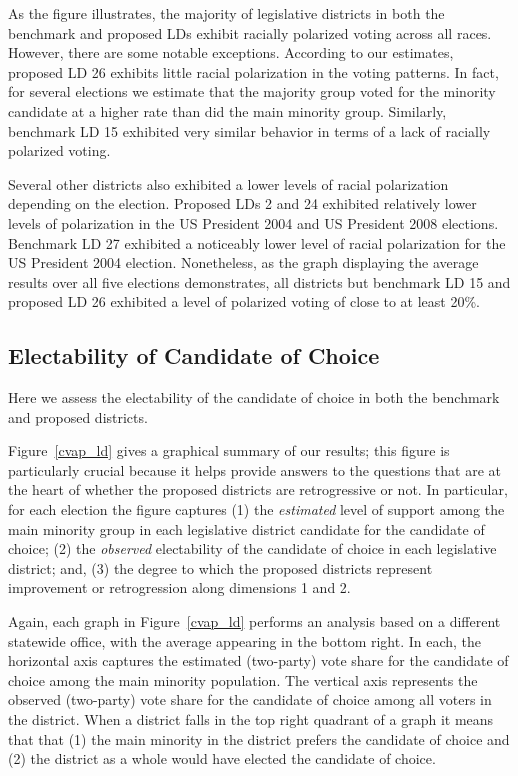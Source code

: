 \documentclass[12pt]{article}
\begin{document}
As the figure illustrates, the majority of legislative districts in both the benchmark and proposed LDs exhibit racially polarized voting across all races. However, there are some notable exceptions. According to our estimates, proposed LD 26 exhibits little racial polarization in the voting patterns. In fact, for several elections we estimate that the majority group voted for the minority candidate at a higher rate than did the main minority group. Similarly, benchmark LD 15 exhibited very similar behavior in terms of a lack of racially polarized voting.

Several other districts also exhibited a lower levels of racial polarization depending on the election. Proposed LDs 2 and 24 exhibited relatively lower levels of polarization in the US President 2004 and US President 2008 elections. Benchmark LD 27 exhibited a noticeably lower level of racial polarization for the US President 2004 election. Nonetheless, as the graph displaying the average results over all five elections demonstrates, all districts but benchmark LD 15 and proposed LD 26 exhibited a level of polarized voting of close to at least 20\%.

\subsection{Electability of Candidate of Choice}

Here we assess the electability of the candidate of choice in both the
benchmark and proposed districts.


Figure~\ref{cvap_ld} gives a graphical summary of our results; this
figure is particularly crucial because it helps provide answers to the
questions that are at the heart of whether the proposed districts are
retrogressive or not. In particular, for each election the figure
captures (1) the {\it estimated} level of support among the main
minority group in each legislative district candidate for the
candidate of choice; (2) the {\it observed} electability of the
candidate of choice in each legislative district; and, (3) the
degree to which the proposed districts represent improvement or
retrogression along dimensions 1 and 2.

Again, each graph in Figure~\ref{cvap_ld} performs an analysis based
on a different statewide office, with the average appearing in the
bottom right.  In each, the horizontal axis captures the estimated
(two-party) vote share for the candidate of choice among the main
minority population. The vertical axis represents the observed
(two-party) vote share for the candidate of choice among all voters in
the district.  When a district falls in the top right quadrant of a
graph it means that that (1) the main minority in the district prefers
the candidate of choice and (2) the district as a whole would have
elected the candidate of choice.
\end{document}
